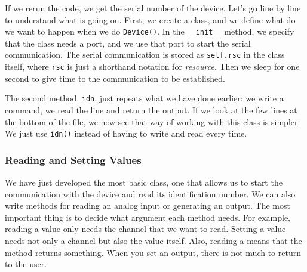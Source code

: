 If we rerun the code, we get the serial number of the device. Let's go line by line to understand what is going on. First, we create a class, and we define what do we want to happen when we do \texttt{Device()}. In the \texttt{\_\_init\_\_} method, we specify that the class needs a port, and we use that port to start the serial communication. The serial communication is stored as \texttt{self.rsc} in the class itself, where \texttt{rsc} is just a shorthand notation for \textit{resource}. Then we sleep for one second to give time to the communication to be established.

The second method, \texttt{idn}, just repeats what we have done earlier: we write a command, we read the line and return the output. If we look at the few lines at the bottom of the file, we now see that way of working with this class is simpler. We just use \texttt{idn()} instead of having to write and read every time.



\subsubsection{Reading and Setting Values}
We have just developed the most basic class, one that allows us to start the communication with the device and read its identification number. We can also write methods for reading an analog input or generating an output. The most important thing is to decide what argument each method needs. For example, reading a value only needs the channel that we want to read. Setting a value needs not only a channel but also the value itself. Also, reading a means that the method returns something. When you set an output, there is not much to return to the user.



